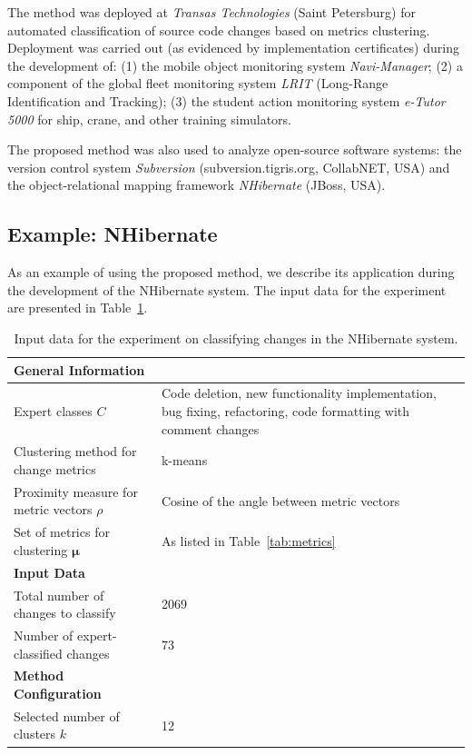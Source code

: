 \documentclass[11pt,a4paper]{article}
\begin{document}
The method was deployed at \textit{Transas Technologies} (Saint Petersburg) for automated classification of source code changes based on metrics clustering. Deployment was carried out (as evidenced by implementation certificates) during the development of: (1) the mobile object monitoring system \textit{Navi-Manager}; (2) a component of the global fleet monitoring system \textit{LRIT} (Long-Range Identification and Tracking); (3) the student action monitoring system \textit{e-Tutor 5000} for ship, crane, and other training simulators.

The proposed method was also used to analyze open-source software systems: the version control system \textit{Subversion} (subversion.tigris.org, CollabNET, USA) and the object-relational mapping framework \textit{NHibernate} (JBoss, USA).

\subsection{Example: NHibernate}
\label{sec:nhibernate}

As an example of using the proposed method, we describe its application during the development of the NHibernate system. The input data for the experiment are presented in Table~\ref{tab:nhibernate_input}.

\begin{table}[ht]
\centering
\caption{Input data for the experiment on classifying changes in the NHibernate system.}
\label{tab:nhibernate_input}
\begin{tabular}{@{}p{7cm}p{7cm}@{}}
\toprule
\textbf{General Information} & \\
\midrule
Expert classes $C$ & Code deletion, new functionality implementation, bug fixing, refactoring, code formatting with comment changes \\
Clustering method for change metrics & k-means \\
Proximity measure for metric vectors $\rho$ & Cosine of the angle between metric vectors \\
Set of metrics for clustering $\boldsymbol{\mu}$ & As listed in Table~\ref{tab:metrics} \\
\midrule
\textbf{Input Data} & \\
\midrule
Total number of changes to classify & 2069 \\
Number of expert-classified changes & 73 \\
\midrule
\textbf{Method Configuration} & \\
\midrule
Selected number of clusters $k$ & 12 \\
\bottomrule
\end{tabular}
\end{table}
\end{document}
